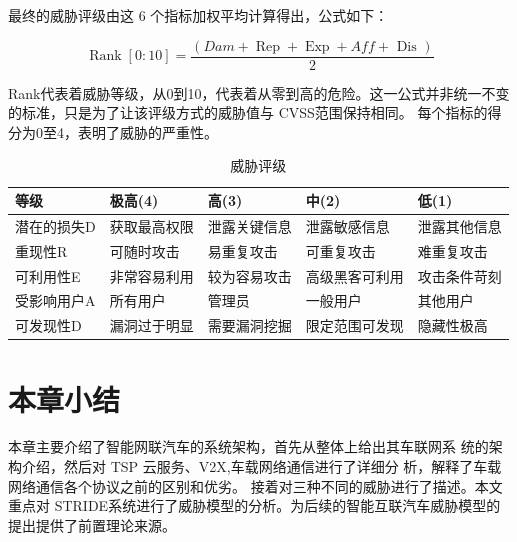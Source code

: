 最终的威胁评级由这 6 个指标加权平均计算得出，公式如下：

$$
\operatorname{Rank}[0: 10]=\frac{(D a m+\operatorname{Rep}+\operatorname{Exp}+A f f+\text { Dis })}{2}
$$

Rank代表着威胁等级，从0到10，代表着从零到高的危险。这一公式并非统一不变的标准，只是为了让该评级方式的威胁值与 CVSS范围保持相同。
每个指标的得分为0至4，表明了威胁的严重性。

\begin{table}
  \caption{威胁评级}
\begin{center}
  \begin{tabular}{|l|l|l|l|l|}
    \hline 等级 & 极高(4) & 高(3) & 中(2) & 低(1) \\
    \hline 潜在的损失D & 获取最高权限 & 泄露关键信息 & 泄露敏感信息 & 泄露其他信息 \\
    \hline 重现性R & 可随时攻击 & 易重复攻击 & 可重复攻击 & 难重复攻击 \\
    \hline 可利用性E & 非常容易利用 & 较为容易攻击 & 高级黑客可利用 & 攻击条件苛刻 \\
    \hline 受影响用户A & 所有用户 & 管理员 & 一般用户 & 其他用户 \\
    \hline 可发现性D & 漏洞过于明显 & 需要漏洞挖掘 & 限定范围可发现 & 隐藏性极高 \\
    \hline
    \end{tabular}
\end{center}
\end{table}




    

\section{本章小结}

本章主要介绍了智能网联汽车的系统架构，首先从整体上给出其车联网系
统的架构介绍，然后对 TSP 云服务、V2X,车载网络通信进行了详细分
析，解释了车载网络通信各个协议之前的区别和优劣。
接着对三种不同的威胁进行了描述。本文重点对 STRIDE系统进行了威胁模型的分析。为后续的智能互联汽车威胁模型的提出提供了前置理论来源。